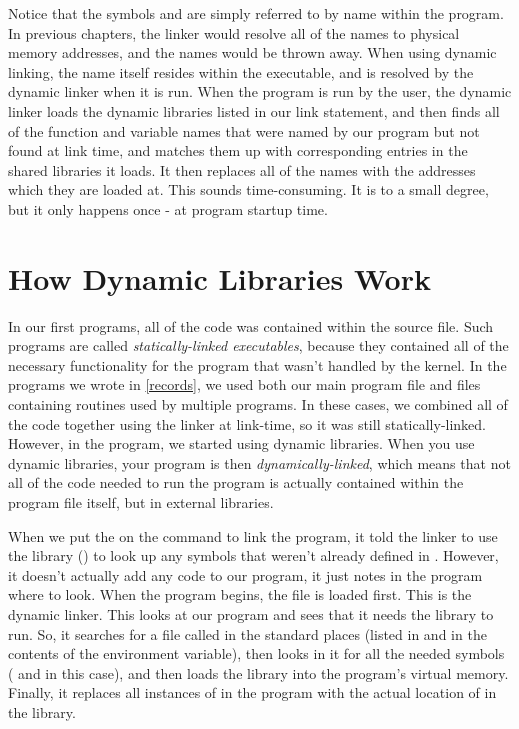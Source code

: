 Notice that the symbols  and 
are simply referred to by name within the program.  In previous chapters, the 
linker would resolve all of the names to physical memory addresses, and the
names would be thrown away.  When using dynamic linking, the name itself
resides within the executable, and is resolved by the dynamic linker when it
is run.  When the program is run by the user,
the dynamic linker loads the 
dynamic libraries listed in our link statement,
and then finds all of the function and variable names that were named by
our program but not found at link time, and matches them up with corresponding
entries in the shared libraries it loads.  It then replaces all of the names
with the addresses which they are loaded at.  This sounds time-consuming.  It
is to a small degree, but it only happens once - at program startup time.

\section{How Dynamic Libraries Work}

In our first programs, all of the code was contained within the
source file.  Such programs are called
\emph{statically-linked executables}, because
they contained all of the necessary functionality for the program
that wasn't handled by the kernel.  In the programs we wrote in
\autoref{records}, we used both our main program file 
and files containing routines used by multiple programs.  In these cases, 
we combined all of the code together using the linker at link-time, so it 
was still statically-linked.
However, in the  program, we started
using dynamic libraries.  When you use dynamic libraries, your program is
then \emph{dynamically-linked}, which means that not all of the code
needed to run the program is actually contained within the program file
itself, but in external libraries.

When we put the  on the command to
link the  program, it told the linker
to use the  library () to look up any symbols that
weren't already defined in .  However,
it doesn't actually add any code to our program, it just notes in
the program where to look.  
When the  program begins, the file
 is loaded first.  This is
the dynamic linker.  This looks at our 
program and sees that it needs the  library
to run.  So, it searches for a file called 
in the standard places (listed in 
and in the contents of the  environment variable),
then looks in it for all the needed symbols ( 
and  in this
case), and then loads the library into the program's virtual memory.
Finally, it replaces all instances of  in the
program with the actual location of  in the
library.  

